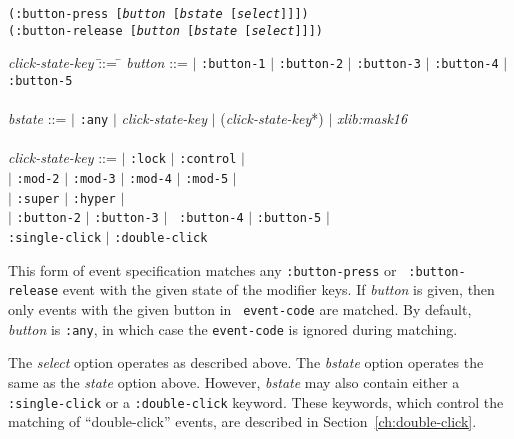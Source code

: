 {\samepage
{}
{\tt (:button-press [{\em button} [{\em bstate} [{\em select}]]])}\\
{\tt (:button-release [{\em button} [{\em bstate} [{\em select}]]])}\\
\hspace*{.75in}
\parbox[t]{5.75in}{
\begin{tabbing}
{\em click-state-key} \= ::= \= \kill
{\em button} \>::=  $|$ {\tt :button-1} $|$ {\tt :button-2} $|$
{\tt :button-3} $|$ {\tt :button-4} $|$ {\tt :button-5}\\
\\
{\em bstate} \>::=  $|$ {\tt :any} $|$ {\em click-state-key} $|$
                      ({\em click-state-key}*) $|$ {\em xlib:mask16} \\
\\
{\em click-state-key} \>::=  $|$ {\tt :lock} $|$ {\tt :control} $|$ \\
                \>     $|$ {\tt :mod-2} $|$ {\tt :mod-3} $|$ {\tt :mod-4} $|$ {\tt :mod-5} $|$ \\
                \>     $|$ {\tt :super} $|$ {\tt :hyper} $|$\\
                \>     $|$ {\tt :button-2} $|$ {\tt :button-3} $|$ {\tt
:button-4} $|$ {\tt :button-5} $|$\\
                \>      \> {\tt :single-click} $|$ {\tt :double-click}\\ 

\end{tabbing}}
}
\begin{flushright}
\parbox[t]{5.75in}{
This form of event specification matches any {\tt :button-press} or {\tt
:button-release} event with the given state of the modifier keys.  If
{\em button} is given, then only events with the given button in {\tt
event-code} are matched.  By default, {\em button} is {\tt :any}, in
which case the {\tt event-code} is ignored during matching.  }

\parbox[t]{5.75in}{
The {\em select} option operates as described above. The {\em bstate}
option operates the same as the {\em state} option above. However, {\em
bstate} may also contain either a {\tt :single-click} or a {\tt :double-click}
keyword. These keywords, which control the matching of ``double-click''
events, are described in Section~\ref{ch:double-click}.
}
\end{flushright}

